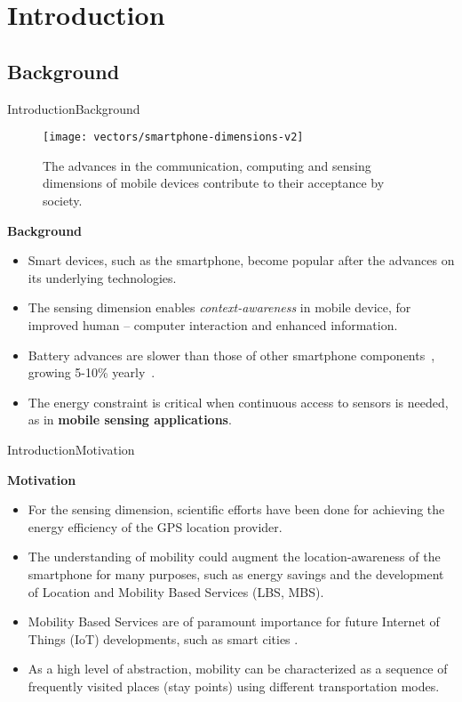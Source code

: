 \section{Introduction}
\subsection{Background}
\begin{frame}{Introduction}{Background}
\small
\begin{figure}[tb]
  \centering
  \texttt{[image: vectors/smartphone-dimensions-v2]}
  \caption{The advances in the communication, computing and sensing dimensions of mobile devices contribute to their acceptance by society.}  
\end{figure}

\begin{block}{\small \textbf{Background}}
\begin{itemize}
	\item Smart devices, such as the smartphone, become popular after the advances on its underlying technologies.
	\item The sensing dimension enables \emph{context-awareness} in mobile device, for improved human -- computer interaction and enhanced information.
	\item Battery advances are slower than those of other smartphone components~\cite{Kjaergaard2012}, growing 5-10\% yearly~\cite{Ma2012,Evarts2015}.
	\item The energy constraint is critical when continuous access to sensors is needed, as in \textbf{mobile sensing applications}.
\end{itemize}
\end{block}
\end{frame}

\begin{frame}{Introduction}{Motivation}
\small
\begin{block}{\small \textbf{Motivation}}
\begin{itemize}
	\item For the sensing dimension, scientific efforts have been done for achieving the energy efficiency of the GPS location provider.
	\item The understanding of mobility could augment the location-awareness of the smartphone for many purposes, such as energy savings and the development of Location and Mobility Based Services (LBS, MBS).
	\item Mobility Based Services are of paramount importance for future Internet of Things (IoT) developments, such as smart cities \cite{Zanella2014}.
	\item As a high level of abstraction, mobility can be characterized as a sequence of frequently visited places (stay points) using different transportation modes.
\end{itemize}
\end{block}
\end{frame}